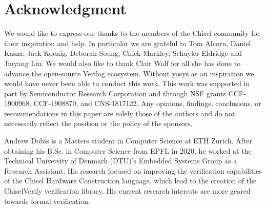 \documentclass[conference]{IEEEtran}
\begin{document}
\section*{Acknowledgment}
We would like to express our thanks to the members of the Chisel community for their 
inspiration and help. %
In particular we are grateful to Tom Alcorn, Daniel Kasza, Jack Koenig, Deborah Soung,
Chick Markley, Schuyler Eldridge and Jiuyang Liu.
We would also like to thank Clair Wolf for all she has done to advance the open-source Verilog ecosystem.
Without yosys as an inspiration we would have never been able to conduct this work.
This work was supported in part by Semiconductor Research Corporation and through NSF grants CCF-1900968, CCF-1908870, and CNS-1817122.
Any opinions, findings, conclusions, or recommendations in this
paper are solely those of the authors and do not necessarily
reflect the position or the policy of the sponsors.




\begin{IEEEbiography}{Andrew Dobis}
is a Masters student in Computer Science at ETH Zurich. 
After obtaining his B.Sc. in Computer Science from EPFL in 2020, he worked at the Technical University of Denmark (DTU)'s Embedded Systems Group as a Research Assistant.
His research focused on improving the verification capabilities of the Chisel Hardware Construction language, which lead to the creation of the ChiselVerify verification library.
His current research interests are more geared towards formal verification.
\end{IEEEbiography}
\end{document}
